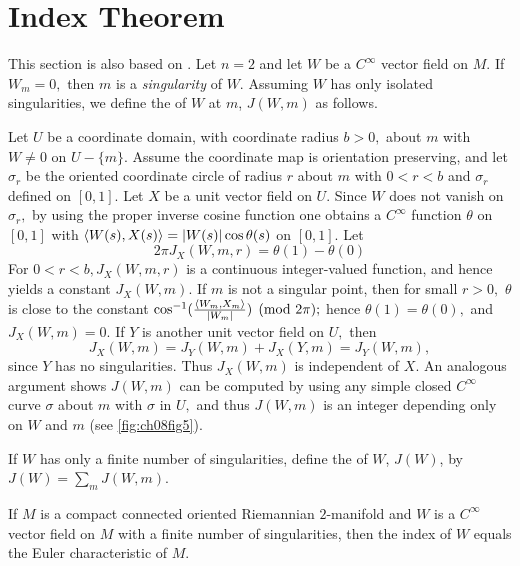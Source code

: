 \documentclass[../main]{subfiles}
\begin{document}
\section{Index Theorem}\label{ch08:s2}

This section is also based on \cite{samelson1955differential}. Let $n=2$ and let $W$ be a $C^\infty$ vector field on $M.$ If $W_m=0,$ then $m$ is a \emph{singularity} of $W.$ Assuming $W$ has only isolated singularities, we define the  of $W$ at $m$, $J(W,m)$ as follows. 

Let $U$ be a coordinate domain, with coordinate radius $b>0,$ about $m$ with $W \neq 0$ on $U-\{m\}.$ Assume the coordinate map is orientation preserving, and let $\sigma_r$ be the oriented coordinate circle of radius $r$ about $m $ with $0<r<b$ and $\sigma_r$ defined on $[0,1].$ Let $X$ be a unit vector field on $U.$ Since $W$ does not vanish on $\sigma_r,$ by using the proper inverse cosine function one obtains a $C^\infty$ function $\theta$ on $[0,1]$ with $\left\langle W(s),X(s)\right\rangle=|W(s)|\cos \theta(s)$ on $[0,1].$ Let
\begin{equation}\tag{4}\label{eqn:ch08.4}
    2\pi J_X(W,m,r)=\theta(1)-\theta(0)
\end{equation}
For $0<r<b, J_X(W,m,r)$ is a continuous integer-valued function, and hence yields a constant $J_X(W,m).$ If $m$ is not a singular point, then for small $r>0,$ $\theta$ is close to the constant $\cos^{-1}(\frac{\left\langle W_m,X_m\right\rangle}{|W_m|})\pmod{2\pi};$ hence $\theta(1)=\theta(0),$ and $J_X(W,m)=0.$ If $Y$ is another unit vector field on $U,$ then \[J_X(W,m)=J_Y(W,m)+J_X(Y,m)=J_Y(W,m),\] since $Y$ has no singularities. Thus $J_X(W,m)$ is independent of $X.$ An analogous argument shows $J(W,m)$ can be computed by using any simple closed $C^\infty$ curve $\sigma$ about $m$ with $\sigma$ in $U,$ and thus $J(W,m)$ is an integer depending only on $W$ and $m$ (see \ref{fig:ch08fig5}). 



If $W$ has only a finite number of singularities, define the  of $W$, $J(W)$, by $J(W)=\sum_m J(W,m)$.



\begin{theorem} \label{thm:ch8.2.1}
If $M$ is a compact connected oriented Riemannian $2$-manifold and $W$ is a $C^\infty$ vector field on $M$ with a finite number of singularities, then the index of $W$ equals the Euler characteristic of $M.$ 
\end{theorem}
\end{document}
